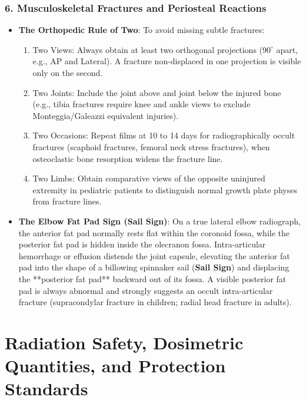 \documentclass[11pt,a4paper]{article}
\begin{document}
\subsubsection{6. Musculoskeletal Fractures and Periosteal Reactions}
\begin{itemize}[leftmargin=*]
    \item \textbf{The Orthopedic Rule of Two}: To avoid missing subtle fractures:
    \begin{enumerate}
        \item Two Views: Always obtain at least two orthogonal projections ($90^\circ$ apart, e.g., AP and Lateral). A fracture non-displaced in one projection is visible only on the second.
        \item Two Joints: Include the joint above and joint below the injured bone (e.g., tibia fractures require knee and ankle views to exclude Monteggia/Galeazzi equivalent injuries).
        \item Two Occasions: Repeat films at 10 to 14 days for radiographically occult fractures (scaphoid fractures, femoral neck stress fractures), when osteoclastic bone resorption widens the fracture line.
        \item Two Limbs: Obtain comparative views of the opposite uninjured extremity in pediatric patients to distinguish normal growth plate physes from fracture lines.
    \end{enumerate}
    \item \textbf{The Elbow Fat Pad Sign (Sail Sign)}: On a true lateral elbow radiograph, the anterior fat pad normally rests flat within the coronoid fossa, while the posterior fat pad is hidden inside the olecranon fossa. Intra-articular hemorrhage or effusion distends the joint capsule, elevating the anterior fat pad into the shape of a billowing spinnaker sail (\textbf{Sail Sign}) and displacing the **posterior fat pad** backward out of its fossa. A visible posterior fat pad is always abnormal and strongly suggests an occult intra-articular fracture (supracondylar fracture in children; radial head fracture in adults).
\end{itemize}

\section{Radiation Safety, Dosimetric Quantities, and Protection Standards}
\end{document}
